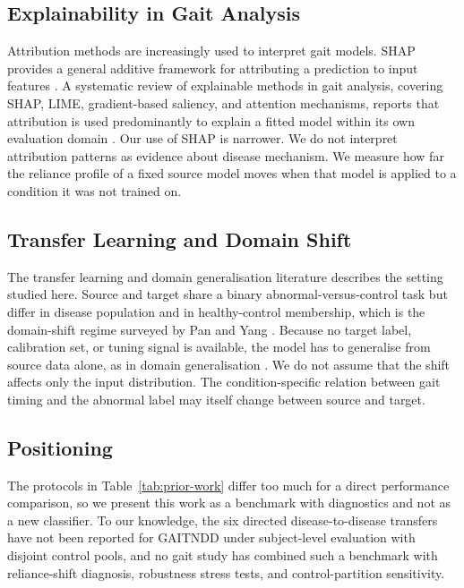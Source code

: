 \documentclass[conference]{IEEEtran}
\begin{document}
\subsection{Explainability in Gait Analysis}
Attribution methods are increasingly used to interpret gait models. SHAP provides a general additive framework for attributing a prediction to input features \cite{lundberg2017shap}. A systematic review of explainable methods in gait analysis, covering SHAP, LIME, gradient-based saliency, and attention mechanisms, reports that attribution is used predominantly to explain a fitted model within its own evaluation domain \cite{xiang2025xai}. Our use of SHAP is narrower. We do not interpret attribution patterns as evidence about disease mechanism. We measure how far the reliance profile of a fixed source model moves when that model is applied to a condition it was not trained on.

\subsection{Transfer Learning and Domain Shift}
The transfer learning and domain generalisation literature describes the setting studied here. Source and target share a binary abnormal-versus-control task but differ in disease population and in healthy-control membership, which is the domain-shift regime surveyed by Pan and Yang \cite{pan2010transfer}. Because no target label, calibration set, or tuning signal is available, the model has to generalise from source data alone, as in domain generalisation \cite{zhou2021dgsurvey}. We do not assume that the shift affects only the input distribution. The condition-specific relation between gait timing and the abnormal label may itself change between source and target.

\subsection{Positioning}
The protocols in Table~\ref{tab:prior-work} differ too much for a direct performance comparison, so we present this work as a benchmark with diagnostics and not as a new classifier. To our knowledge, the six directed disease-to-disease transfers have not been reported for GAITNDD under subject-level evaluation with disjoint control pools, and no gait study has combined such a benchmark with reliance-shift diagnosis, robustness stress tests, and control-partition sensitivity.
\end{document}
